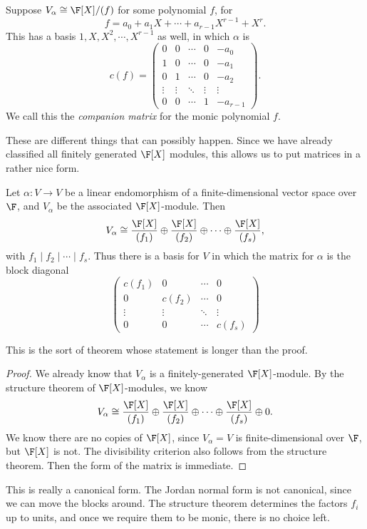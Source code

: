 \documentclass[a4paper]{article}
\begin{document}
\begin{eg}
  Suppose $V_\alpha \cong \F[X]/(f)$ for some polynomial $f$, for
  \[
    f = a_0 + a_1X + \cdots + a_{r - 1} X^{r - 1} + X^r.
  \]
  This has a basis $1, X, X^2, \cdots, X^{r - 1}$ as well, in which $\alpha$ is
  \[
    c(f) =
    \begin{pmatrix}
      0 & 0 & \cdots & 0 & -a_0\\
      1 & 0 & \cdots & 0 & -a_1\\
      0 & 1 & \cdots & 0 & -a_2\\
      \vdots & \vdots & \ddots & \vdots & \vdots\\
      0 & 0 & \cdots & 1 & -a_{r - 1}
    \end{pmatrix}.
  \]
  We call this the \emph{companion matrix} for the monic polynomial $f$.
\end{eg}
These are different things that can possibly happen. Since we have already classified all finitely generated $\F[X]$ modules, this allows us to put matrices in a rather nice form.

\begin{thm}
  Let $\alpha: V \to V$ be a linear endomorphism of a finite-dimensional vector space over $\F$, and $V_\alpha$ be the associated $\F[X]$-module. Then
  \[
    V_\alpha \cong \frac{\F[X]}{(f_1)} \oplus \frac{\F[X]}{(f_2)} \oplus \cdots \oplus \frac{\F[X]}{(f_s)},
  \]
  with $f_1 \mid f_2 \mid \cdots \mid f_s$. Thus there is a basis for $V$ in which the matrix for $\alpha$ is the block diagonal
  \[
    \begin{pmatrix}
      c(f_1) & 0 & \cdots & 0\\
      0 & c(f_2) & \cdots & 0\\
      \vdots & \vdots & \ddots & \vdots\\
      0 & 0 & \cdots & c(f_s)
    \end{pmatrix}
  \]
\end{thm}
This is the sort of theorem whose statement is longer than the proof.

\begin{proof}
  We already know that $V_\alpha$ is a finitely-generated $\F[X]$-module. By the structure theorem of $\F[X]$-modules, we know
  \[
    V_\alpha \cong \frac{\F[X]}{(f_1)} \oplus \frac{\F[X]}{(f_2)} \oplus \cdots \oplus \frac{\F[X]}{(f_s)} \oplus 0.
  \]
  We know there are no copies of $\F[X]$, since $V_\alpha = V$ is finite-dimensional over $\F$, but $\F[X]$ is not. The divisibility criterion also follows from the structure theorem. Then the form of the matrix is immediate.
\end{proof}
This is really a canonical form. The Jordan normal form is not canonical, since we can move the blocks around. The structure theorem determines the factors $f_i$ up to units, and once we require them to be monic, there is no choice left.
\end{document}
